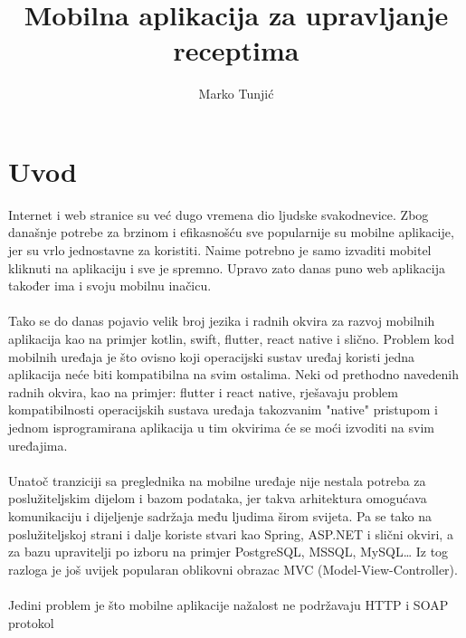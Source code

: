 \documentclass[times, utf8, zavrsni]{fer}
\begin{document}

\title{Mobilna aplikacija za upravljanje receptima}

\author{Marko Tunjić}

\maketitle

\zahvala{}

\tableofcontents

\chapter{Uvod}
Internet i web stranice su već dugo vremena dio ljudske svakodnevice. Zbog
današnje potrebe za brzinom i efikasnošću sve popularnije su mobilne aplikacije,
jer su vrlo jednostavne za koristiti. Naime potrebno je samo izvaditi mobitel
kliknuti na aplikaciju i sve je spremno. Upravo zato danas puno web aplikacija
također ima i svoju mobilnu inačicu.
\\\\
Tako se do danas pojavio velik broj jezika
i radnih okvira za razvoj mobilnih aplikacija kao na primjer kotlin, swift, flutter,
react native i slično. Problem kod mobilnih uređaja je što ovisno koji operacijski
sustav uređaj koristi jedna aplikacija neće biti kompatibilna na svim ostalima.
Neki od prethodno navedenih radnih okvira, kao na primjer: flutter i react native,
rješavaju problem kompatibilnosti operacijskih sustava uređaja takozvanim "native" pristupom
i jednom isprogramirana aplikacija u tim okvirima će se moći izvoditi na svim uređajima.
\\\\
Unatoč tranziciji sa preglednika na mobilne uređaje nije nestala potreba
za poslužiteljskim dijelom i bazom podataka, jer takva arhitektura omogućava
komunikaciju i dijeljenje sadržaja među ljudima širom svijeta. Pa se tako na
poslužiteljskoj strani i dalje koriste stvari kao Spring, ASP.NET i slični okviri,
a za bazu upravitelji po izboru na primjer PostgreSQL, MSSQL, MySQL\dots
Iz tog razloga je još uvijek popularan oblikovni obrazac MVC (Model-View-Controller).
\\\\
Jedini problem je što mobilne aplikacije nažalost ne podržavaju HTTP i SOAP protokol
\end{document}
